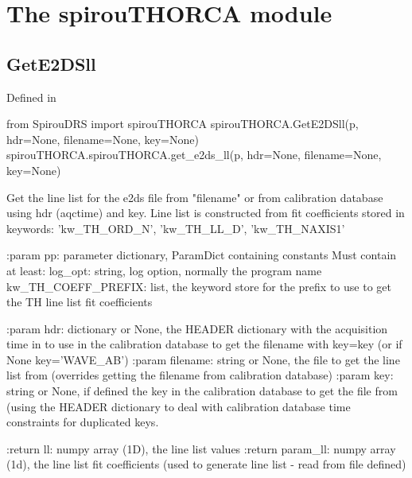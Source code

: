 
\clearpage
\newpage
\noindent\begin{minipage}{\textwidth}
\section{The spirouTHORCA module}
\label{ch:the_module:spirouTHORCA}

\subsection{GetE2DSll}

Defined in \spirouTHORCA{}

\begin{pythonbox}
from SpirouDRS import spirouTHORCA
spirouTHORCA.GetE2DSll(p, hdr=None, filename=None, key=None)
spirouTHORCA.spirouTHORCA.get_e2ds_ll(p, hdr=None, filename=None, key=None)
\end{pythonbox}

\begin{pythondocstring}
Get the line list for the e2ds file from "filename" or from calibration
database using hdr (aqctime) and key. Line list is constructed from
fit coefficients stored in keywords:
    'kw_TH_ORD_N', 'kw_TH_LL_D', 'kw_TH_NAXIS1'

:param pp: parameter dictionary, ParamDict containing constants
    Must contain at least:
            log_opt: string, log option, normally the program name
            kw_TH_COEFF_PREFIX: list, the keyword store for the prefix to
                                use to get the TH line list fit coefficients

:param hdr: dictionary or None, the HEADER dictionary with the acquisition
            time in to use in the calibration database to get the filename
            with key=key (or if None key='WAVE_AB')
:param filename: string or None, the file to get the line list from
                 (overrides getting the filename from calibration database)
:param key: string or None, if defined the key in the calibration database
            to get the file from (using the HEADER dictionary to deal with
            calibration database time constraints for duplicated keys.

:return ll: numpy array (1D), the line list values
:return param_ll: numpy array (1d), the line list fit coefficients (used to
                  generate line list - read from file defined)
\end{pythondocstring}
\end{minipage}


